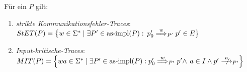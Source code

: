 \begin{Prop}
  \label{KommTracesProp}
  Für ein \MEIO{} $P$ gilt:
  \begin{enumerate}
    \item \emph{strikte Kommunikationsfehler-Traces}: $StET (P) =
      \big\{w\in\Sigma ^* \mid \exists P' \in\mathrm{as}\text{-}\mathrm{impl} (P) :$ $p'_0
      \weakmust[w]_{P'} p' \in E\big\}$ 
    \item \emph{Input-kritische-Traces}: $\MIT (P) = \left\{wa\in\Sigma ^* \mid
      \exists P' \in\asimp (P) : p'_0 \weakmust[w]_{P'} p' \land
      \right.$\linebreak $\left. a\in I\land p'\nmust[a]_{P'} \right\}$
  \end{enumerate}
\end{Prop}
